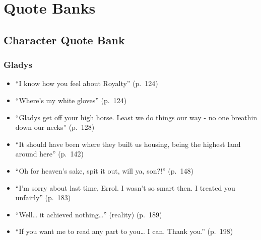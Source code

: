 \documentclass[a4paper]{article}
\begin{document}
\section{Quote Banks}

\subsection{Character Quote Bank}

\subsubsection{Gladys}
\begin{itemize}
    \item ``I know how you feel about Royalty'' (p.~124)
    \item ``Where’s my white gloves'' (p.~124)
    \item ``Gladys get off your high horse. Least we do things our way - no one breathin down our necks'' (p.~128)
    \item ``It should have been where they built us housing, being the highest land around here'' (p.~142)
    \item ``Oh for heaven’s sake, spit it out, will ya, son?!'' (p.~148)
    \item ``I’m sorry about last time, Errol. I wasn’t so smart then. I treated you unfairly'' (p.~183)
    \item ``Well… it achieved nothing…'' (reality) (p.~189)
    \item ``If you want me to read any part to you… I can. Thank you.'' (p.~198)
\end{itemize}
\end{document}
